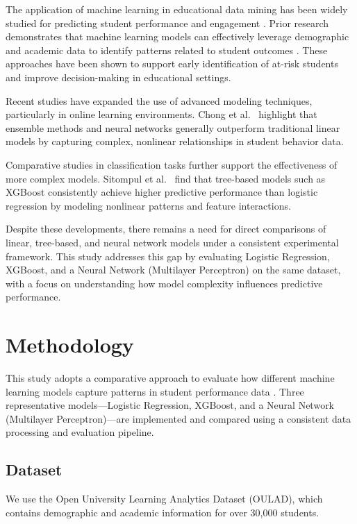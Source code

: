 \documentclass[conference]{IEEEtran}
\begin{document}
The application of machine learning in educational data mining has been widely studied for predicting student performance and engagement \cite{nayak2023}. Prior research demonstrates that machine learning models can effectively leverage demographic and academic data to identify patterns related to student outcomes \cite{chen2015}. These approaches have been shown to support early identification of at-risk students and improve decision-making in educational settings.

Recent studies have expanded the use of advanced modeling techniques, particularly in online learning environments. Chong et al.~\cite{chong2025} highlight that ensemble methods and neural networks generally outperform traditional linear models by capturing complex, nonlinear relationships in student behavior data.

Comparative studies in classification tasks further support the effectiveness of more complex models. Sitompul et al.~\cite{sitompul2025} find that tree-based models such as XGBoost consistently achieve higher predictive performance than logistic regression by modeling nonlinear patterns and feature interactions.

Despite these developments, there remains a need for direct comparisons of linear, tree-based, and neural network models under a consistent experimental framework. This study addresses this gap by evaluating Logistic Regression, XGBoost, and a Neural Network (Multilayer Perceptron) on the same dataset, with a focus on understanding how model complexity influences predictive performance.
\section{Methodology}
This study adopts a comparative approach to evaluate how different machine learning models capture patterns in student performance data \cite{nayak2023}. Three representative models—Logistic Regression, XGBoost, and a Neural Network (Multilayer Perceptron)—are implemented and compared using a consistent data processing and evaluation pipeline. 

\subsection{Dataset}

We use the Open University Learning Analytics Dataset (OULAD), which contains demographic and academic information for over 30,000 students.
\end{document}
